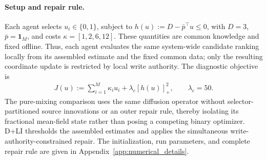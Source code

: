 \documentclass[letterpaper, 10 pt, conference]{ieeeconf} %
\begin{document}
\paragraph{Setup and repair rule.}
Each agent selects \(u_i\in\{0,1\}\), subject to \(h(u):=D-\bar p^\top u\le0\), with \(D=3\), \(\bar p=\mathbf 1_M\), and costs \(\kappa=[1,2,6,12]\). These quantities are common knowledge and fixed offline. Thus, each agent evaluates the same system-wide candidate ranking locally from its assembled estimate and the fixed common data; only the resulting coordinate update is restricted by local write authority. The diagnostic objective is
\begin{align}
J(u):=
\sum_{i=1}^M\kappa_i u_i+\lambda_c[h(u)]_+^2,
\qquad
\lambda_c=50.
\end{align}
The pure-mixing comparison uses the same diffusion operator without selector-partitioned source innovations or an outer repair rule, thereby isolating its fractional mean-field state rather than posing a competing binary optimizer. D+LI thresholds the assembled estimates and applies the simultaneous write-authority-constrained repair. The initialization, run parameters, and complete repair rule are given in Appendix~\ref{app:numerical_details}.
\end{document}
